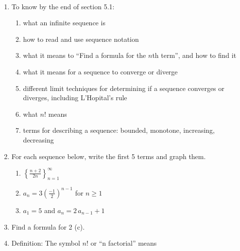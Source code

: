 \documentclass[11pt,fleqn]{article}
\newcommand{\ds}{\displaystyle}
\begin{document}
\renewcommand{\headrulewidth}{0pt}
\newcommand{\blank}[1]{\rule{#1}{0.75pt}}
\newcommand{\bc}{\begin{center}}
\newcommand{\ec}{\end{center}}


\vspace*{-0.7in}

\begin{center}
  \large
  \\
   
\end{center}

\begin{enumerate}
\item To know by the end of section 5.1:
\begin{multicols}{2}
	\begin{enumerate}
	\item what an infinite sequence is
	\item how to read and use sequence notation
	\item what it means to ``Find a formula for the $n$th term'', and how to find it
	\item what it means for a sequence to converge or diverge
	\item different limit techniques for determining if a sequence converges or diverges, including L'Hopital's rule
	\item what $n!$ means
	\item terms for describing a sequence: bounded, monotone, increasing, decreasing
	\end{enumerate}
\end{multicols}
\item For each sequence below, write the first 5 terms and graph them.
	\begin{enumerate}
	\item $\ds \left\{ \frac{n+2}{2n} \right\}_{n=1}^\infty$
	\vfill
	\item $\ds a_n=3\left(\frac{-1}{2} \right)^{n-1}$ for $n\geq 1$
	\vfill
	\item $a_1=5$ and $a_n = 2\, a_{n-1} +1$
	\vfill
	\end{enumerate}
\item Find a formula for 2 (c).
\vspace{1.5in}
\newpage
\item Definition: The symbol $n!$ or ``n factorial'' means


\end{enumerate}
\end{document}
